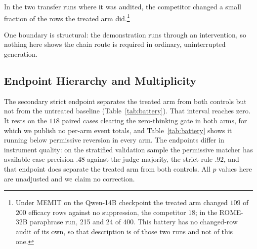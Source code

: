 \documentclass[letterpaper]{article} %
\begin{document}
In the two transfer runs where it was audited, the competitor changed a small fraction of the rows the treated arm did.\footnote{Under MEMIT on the Qwen-14B checkpoint the treated arm changed \(109\) of \(200\) efficacy rows against no suppression, the competitor \(18\); in the ROME-32B paraphrase run, 215 and 24 of 400.  This battery has no changed-row audit of its own, so that description is of those two runs and not of this one.} %

One boundary is structural: the demonstration runs through an intervention, so nothing here shows the chain route is required in ordinary, uninterrupted generation.

\subsection{Endpoint Hierarchy and Multiplicity}
\label{sec:control-endpoints}

The secondary strict endpoint separates the treated arm from both controls but not from the untreated baseline (Table~\ref{tab:battery}).  That interval reaches zero.  It rests on the \(118\) paired cases clearing the zero-thinking gate in both arms, for which we publish no per-arm event totals, and Table~\ref{tab:battery} shows it running below permissive reversion in every arm.  The endpoints differ in instrument quality: on the stratified validation sample the permissive matcher has available-case precision \(.48\) against the judge majority, the strict rule \(.92\), and that endpoint does separate the treated arm from both controls.  All \(p\) values here are unadjusted and we claim no correction. %
\end{document}
